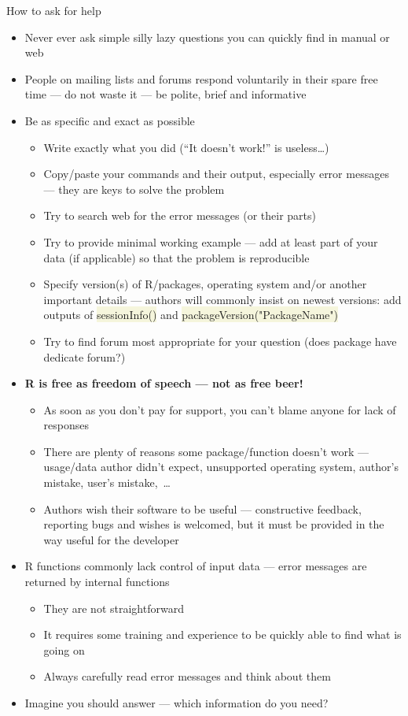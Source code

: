 \documentclass[compress, xelatex, 11pt, xcolor=svgnames, aspectratio=169,
	hyperref={
		bookmarks=true,
		unicode=true,
		colorlinks=true,
		pdftitle={Molecular data in R},
		plainpages=false,
		pdfauthor={Vojtech Zeisek},
		pdfsubject={Course about phylogeny and evolution in R},
		pdfcreator={XeLaTeX},
		pdfkeywords={R, evolution, phylogeny, molecular data},
		linkcolor=Crimson, %
		anchorcolor=Magenta, %
		citecolor=Magenta, %
		filecolor=Magenta, %
		menucolor=Magenta, %
		urlcolor=DodgerBlue, %
		},
	url={hyphens, lowtilde} %
	]{beamer}
\renewcommand{\texttt}[1]{\colorbox{Beige}{{\ttfamily #1}}}
\begin{document}
\begin{frame}[allowframebreaks]{How to ask for help}
	\label{howtoask}
	\begin{itemize}
		\item \alert{Never ever} ask simple silly lazy questions you can quickly find in manual or web
		\item People on mailing lists and forums respond voluntarily in their spare free time --- do not waste it --- be polite, brief and informative
		\item Be as specific and exact as possible
		\begin{itemize}
			\item Write \alert{exactly} what you did (\enquote{It doesn't work!} is useless\ldots)
			\item Copy/paste your commands and their output, especially error messages --- they are keys to solve the problem
			\item Try to search web for the error messages (or their parts)
			\item Try to provide minimal working example --- add at least part of your data (if applicable) so that the problem is reproducible
			\item Specify version(s) of R/packages, operating system and/or another important details --- authors will commonly insist on newest versions: add outputs of \texttt{sessionInfo()} and \texttt{packageVersion("PackageName")}
			\item Try to find forum most appropriate for your question (does package have dedicate forum?)
		\end{itemize}
		\item \textbf{R is free as freedom of speech --- not as free beer!}
		\begin{itemize}
			\item As soon as you don't pay for support, you can't blame anyone for lack of responses
			\item There are plenty of reasons some package/function doesn't work --- usage/data author didn't expect, unsupported operating system, author's mistake, user's mistake,~\ldots
			\item Authors wish their software to be useful --- constructive feedback, reporting bugs and wishes is welcomed, but it must be provided in the way useful for the developer
		\end{itemize}
		\item R functions commonly lack control of input data --- error messages are returned by internal functions
		\begin{itemize}
			\item They are not straightforward
			\item It requires some training and experience to be quickly able to find what is going on
			\item Always carefully read error messages and think about them
		\end{itemize}
		\item Imagine you should answer --- which information do you need?
	\end{itemize}
\end{frame}
\end{document}
